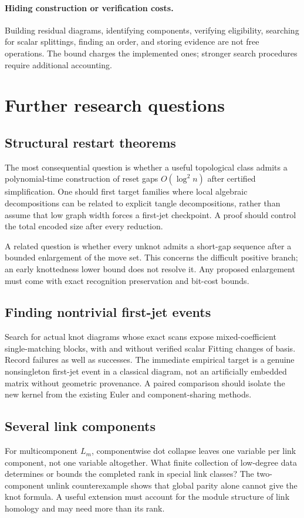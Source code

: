 \documentclass[11pt]{article}
\theoremstyle{definition}\newtheorem{definition}[theorem]{Definition}\newtheorem{example}[theorem]{Example}
\theoremstyle{remark}\newtheorem{remark}[theorem]{Remark}
\begin{document}
\paragraph{Hiding construction or verification costs.}
Building residual diagrams, identifying components, verifying eligibility, searching for scalar splittings, finding an order, and storing evidence are not free operations. The bound charges the implemented ones; stronger search procedures require additional accounting.

\section{Further research questions}
\subsection{Structural restart theorems}
The most consequential question is whether a useful topological class admits a polynomial-time construction of reset gaps $O(\log^2 n)$ after certified simplification. One should first target families where local algebraic decompositions can be related to explicit tangle decompositions, rather than assume that low graph width forces a first-jet checkpoint. A proof should control the total encoded size after every reduction.

A related question is whether every unknot admits a short-gap sequence after a bounded enlargement of the move set. This concerns the difficult positive branch; an early knottedness lower bound does not resolve it. Any proposed enlargement must come with exact recognition preservation and bit-cost bounds.

\subsection{Finding nontrivial first-jet events}
Search for actual knot diagrams whose exact scans expose mixed-coefficient single-matching blocks, with and without verified scalar Fitting changes of basis. Record failures as well as successes. The immediate empirical target is a genuine nonsingleton first-jet event in a classical diagram, not an artificially embedded matrix without geometric provenance. A paired comparison should isolate the new kernel from the existing Euler and component-sharing methods.

\subsection{Several link components}
For multicomponent $L_m$, componentwise dot collapse leaves one variable per link component, not one variable altogether. What finite collection of low-degree data determines or bounds the completed rank in special link classes? The two-component unlink counterexample shows that global parity alone cannot give the knot formula. A useful extension must account for the module structure of link homology and may need more than its rank.
\end{document}
